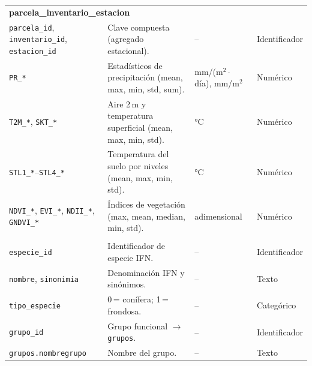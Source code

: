 \begin{longtable}{@{}p{2.8cm} p{6.8cm} p{2.2cm} p{2.2cm}@{}}
    \multicolumn{4}{l}{\textbf{parcela\_inventario\_estacion}}                                                                                                                                     \\
    \texttt{parcela\_id}, \texttt{inventario\_id}, \texttt{estacion\_id}   & Clave compuesta (agregado estacional).                         & --                           & Identificador         \\
    \texttt{PR\_*}                                                         & Estadísticos de precipitación (mean, max, min, std, sum).      & mm/(m$^2\cdot$día), mm/m$^2$ & Numérico              \\
    \texttt{T2M\_*}, \texttt{SKT\_*}                                       & Aire 2\,m y temperatura superficial (mean, max, min, std).     & °C                           & Numérico              \\
    \texttt{STL1\_*}--\texttt{STL4\_*}                                     & Temperatura del suelo por niveles (mean, max, min, std).       & °C                           & Numérico              \\
    \texttt{NDVI\_*}, \texttt{EVI\_*}, \texttt{NDII\_*}, \texttt{GNDVI\_*} & Índices de vegetación (max, mean, median, min, std).           & adimensional                 & Numérico              \\
    \addlinespace

    \multicolumn{4}{l}{\textbf{especies} y \textbf{grupos}}                                                                                                                                        \\
    \texttt{especie\_id}                                                   & Identificador de especie IFN.                                  & --                           & Identificador         \\
    \texttt{nombre}, \texttt{sinonimia}                                    & Denominación IFN y sinónimos.                                  & --                           & Texto                 \\
    \texttt{tipo\_especie}                                                 & 0\,= conífera; 1\,= frondosa.                                  & --                           & Categórico            \\
    \texttt{grupo\_id}                                                     & Grupo funcional $\rightarrow$ \texttt{grupos}.                 & --                           & Identificador         \\
    \texttt{grupos.nombregrupo}                                            & Nombre del grupo.                                              & --                           & Texto                 \\
\end{longtable}
\normalsize
\twocolumn

